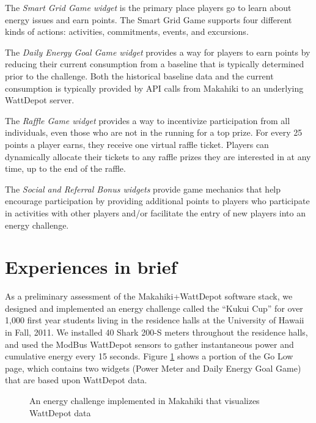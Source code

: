 \documentclass{acm_proc_article-sp}
\begin{document}
The {\em Smart Grid Game widget} is the primary place players go to learn about energy issues and earn
points.  The Smart Grid Game supports four different kinds of actions: activities,
commitments, events, and excursions. 

The {\em Daily Energy Goal Game widget} provides a way for players to earn points by reducing their
current consumption from a baseline that is typically determined prior to the challenge.
Both the historical baseline data and the current consumption is typically provided
by API calls from Makahiki to an underlying WattDepot server.


The {\em Raffle Game widget} provides a way to incentivize participation from all individuals, even
those who are not in the running for a top prize. For every 25 points a player earns, they
receive one virtual raffle ticket. Players can dynamically allocate their tickets to any
raffle prizes they are interested in at any time, up to the end of the raffle.

The {\em Social and Referral Bonus widgets} provide game mechanics that help encourage
participation by providing additional points to players who participate in activities with
other players and/or facilitate the entry of new players into an energy challenge. 

\section{Experiences in brief}

As a preliminary assessment of the Makahiki+WattDepot software stack, we designed and
implemented an energy challenge called the ``Ku\-kui Cup'' for over 1,000 first year
students living in the residence halls at the University of Hawaii in Fall, 2011.  We
installed 40 Shark 200-S meters throughout the residence halls, and used the ModBus
WattDepot sensors to gather instantaneous power and cumulative energy every 15 seconds.
Figure \ref{fig:golow} shows a portion of the Go Low page, which contains two widgets
(Power Meter and Daily Energy Goal Game) that are based upon WattDepot data.

\begin{figure}
\begin{center}
\end{center}
\caption{An energy challenge implemented in Makahiki that visualizes WattDepot data}
\label{fig:golow}
\end{figure}
\end{document}
